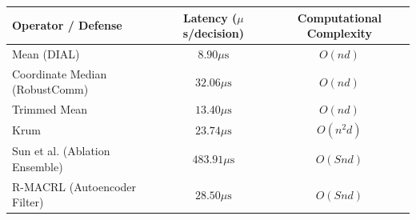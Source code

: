 \begin{tabular}{@{}lcc@{}}
\toprule
Operator / Defense & Latency ($\mu$s/decision) & Computational Complexity \\
\midrule
Mean (DIAL) & $8.90\mu\text{s}$ & $O(n d)$ \\
Coordinate Median (RobustComm) & $32.06\mu\text{s}$ & $O(n d)$ \\
Trimmed Mean & $13.40\mu\text{s}$ & $O(n d)$ \\
Krum & $23.74\mu\text{s}$ & $O(n^2 d)$ \\
Sun et al. (Ablation Ensemble) & $483.91\mu\text{s}$ & $O(S n d)$ \\
R-MACRL (Autoencoder Filter) & $28.50\mu\text{s}$ & $O(S n d)$ \\
\bottomrule
\end{tabular}
